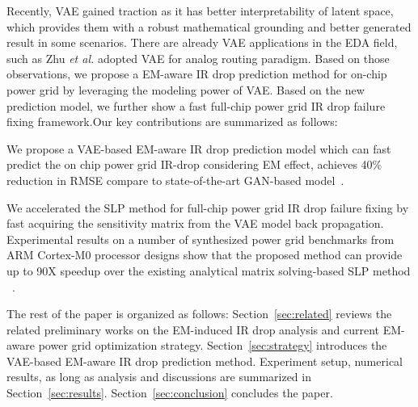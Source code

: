 Recently,  VAE  \cite{Diederik:arxiv'22} gained traction as it has better interpretability of latent space, which provides them with a robust mathematical grounding and better generated result in some scenarios. There are already VAE applications in the EDA field, such as Zhu {\it et al.} \cite{ZhuICCAD19:GeniusRoute} adopted VAE for analog routing paradigm.
Based on those observations, we propose a EM-aware IR drop prediction method for on-chip power grid by leveraging the modeling power of VAE. Based on the new prediction model, we further show a fast full-chip power grid IR drop failure fixing framework.Our key contributions are summarized as follows:

\begin{itemlist}
\item We propose a VAE-based EM-aware IR drop prediction model which can fast predict the on chip power grid IR-drop considering EM effect, achieves 40$\%$ reduction in RMSE compare to state-of-the-art GAN-based model~\cite{ZhouJin:ICCAD'20}.

\item We accelerated the SLP method for full-chip power grid IR drop failure fixing by fast acquiring the sensitivity matrix from the VAE model back propagation.  Experimental results on a number of synthesized power grid benchmarks from ARM Cortex-M0 processor designs show that the proposed method can provide up to 90X speedup over the existing analytical matrix solving-based SLP method ~\cite{Sukharev:2019pg}.
 
\end{itemlist}

The rest of the paper is organized as follows: Section~\ref{sec:related} reviews the related preliminary works on the EM-induced IR drop analysis and current EM-aware power grid optimization strategy. Section~\ref{sec:strategy} introduces the VAE-based EM-aware IR drop prediction method. Experiment setup, numerical results, as long as analysis and discussions are summarized in Section~\ref{sec:results}.  Section~\ref{sec:conclusion} concludes the paper.
